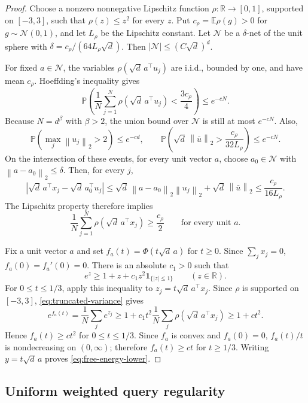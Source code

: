 \documentclass[11pt]{article}
\theoremstyle{remark}
\newcommand{\R}{\mathbb R}
\newcommand{\E}{\mathbb E}
\newcommand{\Pp}{\mathbb P}
\newcommand{\norm}[1]{\left\lVert #1\right\rVert}
\newcommand{\1}{\mathbf 1}
\begin{document}
\begin{proof}
Choose a nonzero nonnegative Lipschitz function
$\rho:\R\to[0,1]$, supported on $[-3,3]$, such that
$\rho(z)\leq z^2$ for every $z$.  Put
$c_\rho=\E\rho(g)>0$ for $g\sim\mathcal N(0,1)$, and let
$L_\rho$ be the Lipschitz constant.  Let $\mathcal N$ be a
$\delta$-net of the unit sphere with
$\delta=c_\rho/(64L_\rho\sqrt d)$.  Then
$|\mathcal N|\leq(C\sqrt d)^d$.

For fixed $a\in\mathcal N$, the variables
$\rho(\sqrt d\,a^\top u_j)$ are i.i.d., bounded by one, and have mean
$c_\rho$.  Hoeffding's inequality gives
\[
 \Pp\!\left(\frac1N\sum_{j=1}^N
 \rho(\sqrt d\,a^\top u_j)<\frac{3c_\rho}{4}\right)
 \leq e^{-cN}.
\]
Because $N=d^\beta$ with $\beta>2$, the union bound over
$\mathcal N$ is still at most $e^{-cN}$.  Also,
\[
 \Pp\!\left(\max_j\norm{u_j}_2>2\right)\leq e^{-cd},
 \qquad
 \Pp\!\left(\sqrt d\,\norm{\bar u}_2>\frac{c_\rho}{32L_\rho}
 \right)\leq e^{-cN}.
\]
On the intersection of these events, for every unit vector $a$, choose
$a_0\in\mathcal N$ with $\norm{a-a_0}_2\leq\delta$.  Then, for every
$j$,
\[
 \left|\sqrt d\,a^\top x_j-
 \sqrt d\,a_0^\top u_j\right|
 \leq\sqrt d\,\norm{a-a_0}_2\norm{u_j}_2
      +\sqrt d\,\norm{\bar u}_2
 \leq\frac{c_\rho}{16L_\rho}.
\]
The Lipschitz property therefore implies
\begin{equation}
 \frac1N\sum_{j=1}^N\rho(\sqrt d\,a^\top x_j)
 \geq\frac{c_\rho}{2}
 \qquad\text{for every unit }a.
 \label{eq:truncated-variance}
\end{equation}

Fix a unit vector $a$ and set
$f_a(t)=\Phi(t\sqrt d\,a)$ for $t\geq0$.  Since $\sum_jx_j=0$,
$f_a(0)=f_a'(0)=0$.  There is an absolute $c_1>0$ such that
\[
 e^z\geq1+z+c_1z^2\1_{\{|z|\leq1\}}
 \qquad(z\in\R).
\]
For $0\leq t\leq1/3$, apply this inequality to
$z_j=t\sqrt d\,a^\top x_j$.  Since $\rho$ is supported on $[-3,3]$,
\eqref{eq:truncated-variance} gives
\[
 e^{f_a(t)}
 =\frac1N\sum_je^{z_j}
 \geq1+c_1t^2\frac1N\sum_j\rho(\sqrt d\,a^\top x_j)
 \geq1+ct^2.
\]
Hence $f_a(t)\geq ct^2$ for $0\leq t\leq1/3$.  Since $f_a$ is convex
and $f_a(0)=0$, $f_a(t)/t$ is nondecreasing on $(0,\infty)$; therefore
$f_a(t)\geq ct$ for $t\geq1/3$.  Writing
$y=t\sqrt d\,a$ proves \eqref{eq:free-energy-lower}.
\end{proof}

\subsection{Uniform weighted query regularity}
\end{document}
